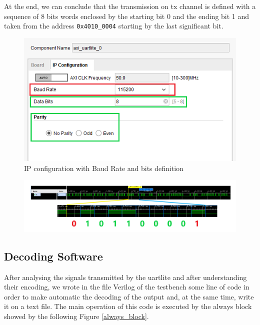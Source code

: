 At the end, we can conclude that the transmission on tx channel is defined with a sequence of 8 bits words enclosed by the starting bit 0 and the ending bit 1 and taken from the address \verb+0x4010_0004+ starting by the last significant bit.

\begin{figure}[!hb]
  \includegraphics{./../../img/Images/uartlite_ip_configuration_col}
  \caption{IP configuration with {\color{Red}Baud Rate} and {\color{Green} bits} definition}
  \label{ip_config}
\end{figure}

\begin{figure}[!hb]
  \includegraphics[width=\textwidth]{./../../img/Images/uart_tx_0x0d}
  \caption{%
  }
  \label{0x0d_waveform}
\end{figure}


{\color{Blue}\subsection{Decoding Software}}
After analysing the signals transmitted by the uartlite and after understanding their encoding, we wrote in the file Verilog of the testbench some line of code in order to make automatic the decoding of the output and, at the same time, write it on a text file. The main operation of this code is executed by the always block showed by the following Figure \ref{always_block}.

